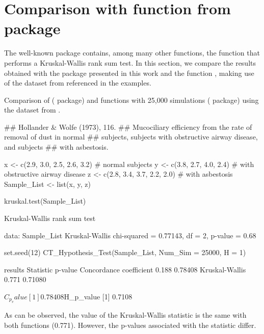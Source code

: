 
\section{Comparison with  function from  package}\label{sec:kruskal.test}

The well-known  package contains, among many other functions, the function  that performs a Kruskal-Wallis rank sum test. In this section, we compare the results obtained with the  package presented in this work and the function , making use of the dataset from \cite{Hollander1973} referenced in the  examples.

\setcounter{exmp}{3}
\begin{exmp} \label{ex:4}
Comparison of  ( package) and  functions with 25,000 simulations ( package) using the dataset from \cite{Hollander1973}.
\begin{example}
## Hollander & Wolfe (1973), 116.
## Mucociliary efficiency from the rate of removal of dust in normal
##  subjects, subjects with obstructive airway disease, and subjects
##  with asbestosis.

x <- c(2.9, 3.0, 2.5, 2.6, 3.2) # normal subjects
y <- c(3.8, 2.7, 4.0, 2.4)      # with obstructive airway disease
z <- c(2.8, 3.4, 3.7, 2.2, 2.0) # with asbestosis
Sample_List <- list(x, y, z)

kruskal.test(Sample_List)

	Kruskal-Wallis rank sum test

data:  Sample_List
Kruskal-Wallis chi-squared = 0.77143, df = 2, p-value = 0.68

set.seed(12)
CT_Hypothesis_Test(Sample_List, Num_Sim = 25000, H = 1)

results
                        Statistic p-value
Concordance coefficient     0.188 0.78408
Kruskal-Wallis              0.771 0.71080

$C_p_value
[1] 0.78408

$H_p_value
[1] 0.7108

\end{example}

\end{exmp}

As can be observed, the value of the Kruskal-Wallis statistic is the same with both functions (0.771). However, the p-values associated with the statistic differ. 

